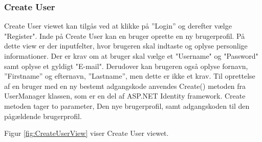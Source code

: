 \subsubsection{Create User}

Create User viewet kan tilgås ved at klikke på ''Login'' og derefter vælge "Register". Inde på Create User kan en bruger oprette en ny brugerprofil. På dette view er der inputfelter, hvor brugeren skal indtaste og oplyse personlige informationer. Der er krav om at bruger skal vælge et "Username" og "Password" samt oplyse et gyldigt "E-mail". Derudover kan brugeren også oplyse fornavn, ''Firstname'' og efternavn, ''Lastname'', men dette er ikke et krav. 
Til oprettelse af en bruger med en ny bestemt adgangskode anvendes Create() metoden fra UserManager klassen, som er en del af ASP.NET Identity framework. Create metoden tager to parameter, Den nye brugerprofil, samt adgangskoden til den pågældende brugerprofil. 

Figur \ref{fig:CreateUserView} viser Create User viewet. 

